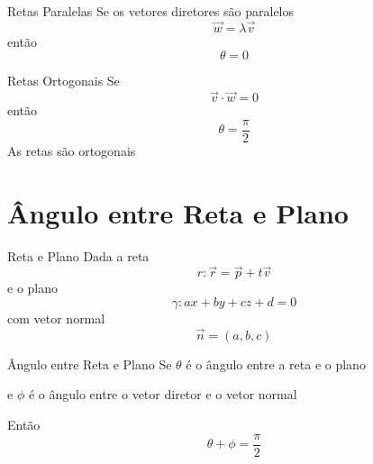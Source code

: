 \documentclass[fleqn,aspectratio=169,12pt]{beamer}
\begin{document}


\begin{frame}{Retas Paralelas}
  Se os vetores diretores são paralelos
  \[
    \vec{w} = \lambda\vec{v}
  \]
  \pause
  então
  \[
    \theta = 0
  \]
\end{frame}

\begin{frame}{Retas Ortogonais}
  Se
  \[
    \vec{v}\cdot\vec{w} = 0
  \]
  \pause
  então
  \[
    \theta = \frac{\pi}{2}
  \]
  \pause
  As retas são ortogonais
\end{frame}

\section{Ângulo entre Reta e Plano}


\begin{frame}{Reta e Plano}
  Dada a reta
  \[
    r\colon
    \vec{r} = \vec{p} + t\vec{v}
  \]
  \pause
  e o plano
  \[
    \gamma\colon ax + by + cz + d = 0
  \]
  \pause
  com vetor normal
  \[
    \vec{n} = (a, b, c)
  \]
\end{frame}

\begin{frame}{Ângulo entre Reta e Plano}
  Se
  \(
    \theta
  \)
  é o ângulo entre a reta e o plano

  \pause
  e
  \(
    \phi
  \)
  é o ângulo entre o vetor diretor e o vetor normal

  \pause
  Então
  \[
    \theta + \phi = \frac{\pi}{2}
  \]
\end{frame}

\end{document}
